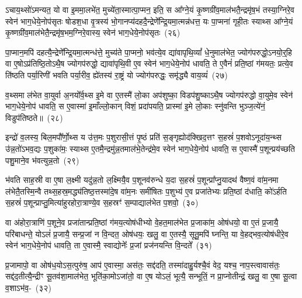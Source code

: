 ऽचाय॒थ्सो॑\-ऽमन्यत॒ यो वा इ॒ममा॒लभे॑त॒ मुच्ये॑ता॒स्मात्पा॒\-प्मन॒ इति॒ स आ᳚ग्ने॒यं कृ॒ष्ण\-ग्री॑व॒मा\-ल॑भतै॒न्द्र\-मृ॑ष॒भं तस्या॒ग्निरे॒व स्वेन॑ भाग॒धेये॒नोप॑सृतः षोडश॒धा वृ॒त्रस्य॑ भो॒गानप्य॑दह\-दै॒न्द्रेणे᳚न्द्रि॒य\-मा॒त्मन्न॑धत्त॒ यः पा॒प्मना॑ गृही॒तः स्याथ्स आ᳚ग्ने॒यं कृ॒ष्ण\-ग्री॑व॒मा\-ल॑भेतै॒न्द्र\-मृ॑ष॒भम॒ग्निरे॒वास्य॒ स्वेन॑ भाग॒धेये॒नोप॑सृतः~(२६)\ip

पा॒प्मान॒मपि॑ दहत्यै॒न्द्रेणे᳚न्द्रि॒यमा॒त्मन्ध॑त्ते॒ मुच्य॑ते पा॒प्मनो॒ भव॑त्ये॒व द्या॑वापृथि॒व्यां᳚ धे॒नुमा\-ल॑भेत॒ ज्योग॑परुद्धो॒\-ऽनयो॒र्॒\mbox{}हि वा ए॒षो\-ऽप्र॑तिष्ठि॒तो\-ऽथै॒ष ज्योगप॑रुद्धो॒ द्यावा॑\-पृथि॒वी ए॒व स्वेन॑ भाग॒धेये॒नोप॑ धावति॒ ते ए॒वैनं॑ प्रति॒ष्ठां ग॑मयतः॒ प्रत्ये॒व ति॑ष्ठति पर्या॒रिणी॑ भवति पर्या॒रीव॒ ह्ये॑तस्य॑ रा॒ष्ट्रं यो ज्योग॑परुद्धः॒ समृ॑द्ध्यै वाय॒व्यं॑~(२७)\ip

व॒थ्समा ल॑भेत वा॒युर्वा अ॒नयो᳚र्व॒थ्स इ॒मे वा ए॒तस्मै॑ लो॒का अप॑शुष्का॒ विडप॑शु॒ष्का\-ऽथै॒ष ज्योगप॑रुद्धो वा॒युमे॒व स्वेन॑ भाग॒धेये॒नोप॑ धावति॒ स ए॒वास्मा॑ इ॒माँल्लो॒कान् विशं॒ प्रदा॑पयति॒ प्रास्मा॑ इ॒मे लो॒काः स्नु॑वन्ति भुञ्ज॒त्ये॑नं॒ विडुप॑तिष्ठते॥~(२८)\ip

{\anuvakamend[{म॒ध्यन्दि॑ने॒ कद्रुं॑ य॒मस्य॒ स्पर्ध॑मानो वैष्णावरु॒णीन्तमिन्द्रो᳚\-ऽस्य॒ स्वेन॑ भाग॒धेये॒नोप॑सृतो वाय॒व्यं॑ द्विच॑त्वारिꣳशच्च।}]}

इन्द्रो॑ व॒लस्य॒ बिल॒मपौ᳚र्णो॒थ्स य उ॑त्त॒मः प॒शुरासी॒त्तं पृ॒ष्ठं प्रति॑ स॒ङ्गृह्योद॑क्खिद॒त्तꣳ स॒हस्रं॑ प॒शवो\-ऽनूदा॑य॒न्थ्स उ॑न्न॒तो॑\-ऽभव॒द्यः प॒शुका॑मः॒ स्याथ्स ए॒तमै॒न्द्रमु॑न्न॒तमाल॑भे॒तेन्द्र॑मे॒व स्वेन॑ भाग॒धेये॒नोप॑ धावति॒ स ए॒वास्मै॑ प॒शून्प्रय॑च्छति पशु॒माने॒व भ॑वत्युन्न॒तो~(२९)\ip

भ॑वति साह॒स्री वा ए॒षा ल॒क्ष्मी यदु॑न्न॒तो ल॒क्ष्मियै॒व प॒शूनव॑\-रुन्धे य॒दा स॒हस्रं॑ प॒शून्प्रा᳚प्नु॒यादथ॑ वैष्ण॒वं वा॑म॒नमा ल॑भेतै॒तस्मि॒न्वै तथ्स॒हस्र॒मद्ध्य॑तिष्ठ॒त्तस्मा॑दे॒ष वा॑म॒नः समी॑षितः प॒शुभ्य॑ ए॒व प्रजा॑तेभ्यः प्रति॒ष्ठां द॑धाति॒ को॑\-ऽर्\mbox{}हति स॒हस्रं॑ प॒शून्प्राप्तु॒मित्या॑हुरहोरा॒त्राण्ये॒व स॒हस्रꣳ॑ स॒म्पाद्याल॑भेत प॒शवो॒~(३०)\ip

वा अ॑होरा॒त्राणि॑ प॒शूने॒व प्रजा॑तान्प्रति॒ष्ठां ग॑मय॒त्योष॑धीभ्यो वे॒हत॒माल॑भेत प्र॒जाका॑म॒ ओष॑धयो॒ वा ए॒तं प्र॒जायै॒ परि॑बाधन्ते॒ यो\-ऽलं॑ प्र॒जायै॒ सन्प्र॒जां न वि॒न्दत॒ ओष॑धयः॒ खलु॒ वा ए॒तस्यै॒ सूतु॒मपि॑ घ्नन्ति॒ या वे॒हद्भव॒त्योष॑धीरे॒व स्वेन॑ भाग॒धेये॒नोप॑ धावति॒ ता ए॒वास्मै॒ स्वाद्योनेः᳚ प्र॒जां प्रज॑नयन्ति वि॒न्दते᳚~(३१)\ip

प्र॒जामापो॒ वा ओष॑ध॒यो\-ऽस॒त्पुरु॑ष॒ आप॑ ए॒वास्मा॒ अस॑तः॒ सद्द॑दति॒ तस्मा॑दाहु॒र्यश्चै॒वं वेद॒ यश्च॒ नाप॒स्त्वावास॑तः॒ सद्द॑द॒तीत्यै॒न्द्रीꣳ सू॒तव॑शा॒मा\-ल॑भेत॒ भूति॑का॒मो\-ऽजा॑तो॒ वा ए॒ष यो\-ऽलं॒ भूत्यै॒ सन्भूतिं॒ न प्रा॒प्नोतीन्द्रं॒ खलु॒ वा ए॒षा सू॒त्वा व॒शा\-ऽभ॑व॒-~(३२)\ip

